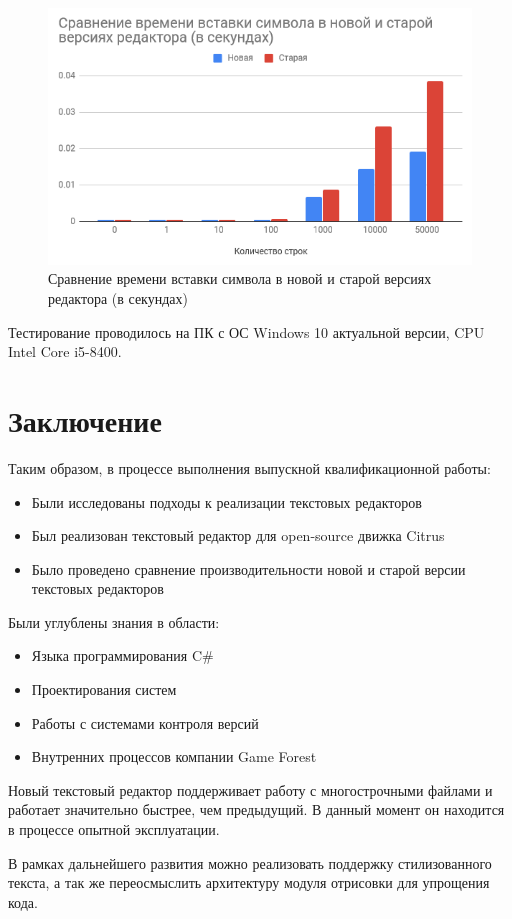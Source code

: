 \documentclass{fefu}
\begin{document}
			\begin{figure}[H]
				\centering
				\includegraphics[width=0.8\linewidth]{images/InsertionComparison.png}
				\caption{Сравнение времени вставки символа в новой и старой версиях редактора
				(в секундах)}
				\label{img:InsertionComparison}
			\end{figure}
			\par Тестирование проводилось на ПК с ОС Windows 10 актуальной версии, CPU Intel
			Core i5-8400.
	\section*{Заключение}
		\par Таким образом, в процессе выполнения выпускной квалификационной работы:
		\begin{itemize}
			\item Были исследованы подходы к реализации текстовых редакторов
			\item Был реализован текстовый редактор для open-source движка Citrus
			\item Было проведено сравнение производительности новой и старой версии текстовых
			редакторов
		\end{itemize}
		\par Были углублены знания в области:
		\begin{itemize}
			\item Языка программирования C\#
			\item Проектирования систем
			\item Работы с системами контроля версий
			\item Внутренних процессов компании Game Forest
		\end{itemize}
		\par Новый текстовый редактор поддерживает работу с многострочными файлами и работает
		значительно быстрее, чем предыдущий. В данный момент он находится в процессе опытной
		эксплуатации.
		\par В рамках дальнейшего развития можно реализовать поддержку стилизованного текста,
		а так же переосмыслить архитектуру модуля отрисовки для упрощения кода.
	\newpage
	
		
\end{document}
